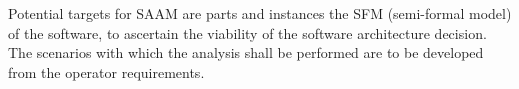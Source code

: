 Potential targets for SAAM are parts and instances the SFM 
(semi-formal model) of the software, to ascertain the 
viability of the software architecture decision. The scenarios 
with which the analysis shall be performed are to be developed
from the operator requirements.
